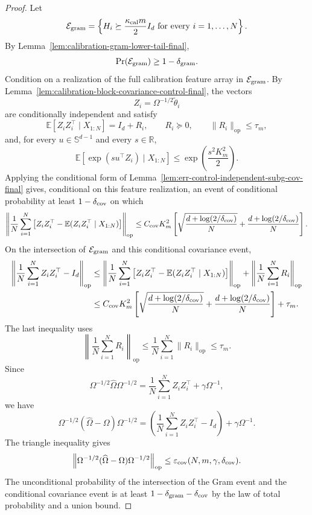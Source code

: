 \documentclass{article} %
\begin{document}
\begin{proof}
Let
\[
\mathcal{E}_{\rm gram}
=
\left\{
H_i\succeq \frac{\kappa_{\rm cal}m}{2}I_d
\text{ for every }i=1,\ldots,N
\right\}.
\]
By Lemma~\ref{lem:calibration-gram-lower-tail-final},
\[
\Pr(\mathcal{E}_{\rm gram})\ge 1-\delta_{\rm gram}.
\]
Condition on a realization of the full calibration feature array in
\(\mathcal{E}_{\rm gram}\).  By
Lemma~\ref{lem:calibration-block-covariance-control-final}, the vectors
\[
Z_i=\Omega^{-1/2}\widetilde\theta_i
\]
are conditionally independent and satisfy
\[
\mathbb{E}[Z_iZ_i^\top\mid X_{1:N}]=I_d+R_i,
\qquad
R_i\succeq0,
\qquad
\|R_i\|_{\mathrm{op}}\le \tau_m,
\]
and, for every \(u\in\mathbb{S}^{d-1}\) and every \(s\in\mathbb{R}\),
\[
\mathbb{E}\!\left[
\exp(su^\top Z_i)\mid X_{1:N}
\right]
\le
\exp\!\left(\frac{s^2K_m^2}{2}\right).
\]
Applying the conditional form of
Lemma~\ref{lem:err-control-independent-subg-cov-final} gives, conditional on
this feature realization, an event of conditional probability at least
\(1-\delta_{\rm cov}\) on which
\[
\left\|
\frac1N\sum_{i=1}^N
\left[
Z_iZ_i^\top-\mathbb{E}(Z_iZ_i^\top\mid X_{1:N})
\right]
\right\|_{\mathrm{op}}
\le
C_{\rm cov}K_m^2
\left[
\sqrt{\frac{d+\log(2/\delta_{\rm cov})}{N}}
+
\frac{d+\log(2/\delta_{\rm cov})}{N}
\right].
\]
On the intersection of \(\mathcal{E}_{\rm gram}\) and this conditional
covariance event,
\[
\begin{aligned}
\left\|
\frac1N\sum_{i=1}^N Z_iZ_i^\top-I_d
\right\|_{\mathrm{op}}
&\le
\left\|
\frac1N\sum_{i=1}^N
\left[
Z_iZ_i^\top-\mathbb{E}(Z_iZ_i^\top\mid X_{1:N})
\right]
\right\|_{\mathrm{op}}
+
\left\|\frac1N\sum_{i=1}^N R_i\right\|_{\mathrm{op}}
\\
&\le
C_{\rm cov}K_m^2
\left[
\sqrt{\frac{d+\log(2/\delta_{\rm cov})}{N}}
+
\frac{d+\log(2/\delta_{\rm cov})}{N}
\right]
+\tau_m.
\end{aligned}
\]
The last inequality uses
\[
\left\|\frac1N\sum_{i=1}^N R_i\right\|_{\mathrm{op}}
\le
\frac1N\sum_{i=1}^N\|R_i\|_{\mathrm{op}}
\le
\tau_m.
\]
Since
\[
\Omega^{-1/2}\widehat\Omega\Omega^{-1/2}
=
\frac1N\sum_{i=1}^N Z_iZ_i^\top+\gamma\Omega^{-1},
\]
we have
\[
\Omega^{-1/2}(\widehat\Omega-\Omega)\Omega^{-1/2}
=
\left(\frac1N\sum_{i=1}^N Z_iZ_i^\top-I_d\right)+\gamma\Omega^{-1}.
\]
The triangle inequality gives
\[
\left\|
\Omega^{-1/2}(\widehat\Omega-\Omega)\Omega^{-1/2}
\right\|_{\mathrm{op}}
\le
\varepsilon_{\rm cov}(N,m,\gamma,\delta_{\rm cov}).
\]
The unconditional probability of the intersection of the Gram event and the
conditional covariance event is at least
\(1-\delta_{\rm gram}-\delta_{\rm cov}\) by the law of total probability and a
union bound.
\end{proof}
\end{document}
